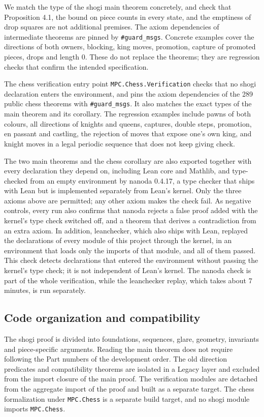 \documentclass[a4paper,11pt]{article}
\newcommand{\code}[1]{{\small\nolinkurl{#1}}}
\theoremstyle{definition}
\begin{document}
We match the type of the shogi main theorem concretely, and check that Proposition 4.1, the bound on piece counts in every state, and the emptiness of drop squares are not additional premises.
The axiom dependencies of intermediate theorems are pinned by \texttt{\#guard\_msgs}.
Concrete examples cover the directions of both owners, blocking, king moves, promotion, capture of promoted pieces, drops and length 0.
These do not replace the theorems; they are regression checks that confirm the intended specification.

The chess verification entry point \code{MPC.Chess.Verification} checks that no shogi declaration enters the environment, and pins the axiom dependencies of the 289 public chess theorems with \texttt{\#guard\_msgs}.
It also matches the exact types of the main theorem and its corollary.
The regression examples include pawns of both colours, all directions of knights and queens, captures, double steps, promotion, en passant and castling, the rejection of moves that expose one's own king, and knight moves in a legal periodic sequence that does not keep giving check.

The two main theorems and the chess corollary are also exported together with every declaration they depend on, including Lean core and Mathlib, and type-checked from an empty environment by nanoda 0.4.17, a type checker that ships with Lean but is implemented separately from Lean's kernel.
Only the three axioms above are permitted; any other axiom makes the check fail.
As negative controls, every run also confirms that nanoda rejects a false proof added with the kernel's type check switched off, and a theorem that derives a contradiction from an extra axiom.
In addition, leanchecker, which also ships with Lean, replayed the declarations of every module of this project through the kernel, in an environment that loads only the imports of that module, and all of them passed.
This check detects declarations that entered the environment without passing the kernel's type check; it is not independent of Lean's kernel.
The nanoda check is part of the whole verification, while the leanchecker replay, which takes about 7 minutes, is run separately.


\subsection{Code organization and compatibility}
The shogi proof is divided into foundations, sequences, glare, geometry, invariants and piece-specific arguments.
Reading the main theorem does not require following the Part numbers of the development order.
The old direction predicates and compatibility theorems are isolated in a Legacy layer and excluded from the import closure of the main proof.
The verification modules are detached from the aggregate import of the proof and built as a separate target.
The chess formalization under \code{MPC.Chess} is a separate build target, and no shogi module imports \code{MPC.Chess}.
\end{document}
